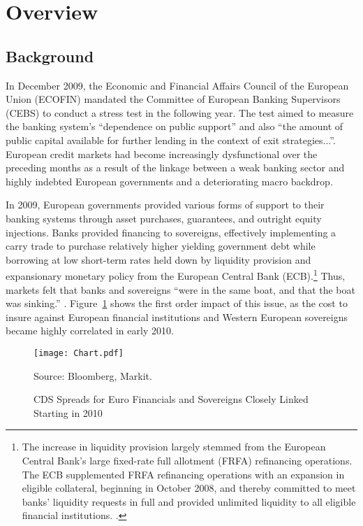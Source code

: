 \documentclass[12pt]{article}
\begin{document}
\section{Overview}

\subsection{Background}

In December 2009, the Economic and Financial Affairs Council of the European Union (ECOFIN) mandated the Committee of European Banking Supervisors (CEBS) to conduct a stress test in the following year. The test aimed to measure the banking system's ``dependence on public support'' and also ``the amount of public capital available for further lending in the context of exit strategies...''\citep{CEBS2009}. European credit markets had become increasingly dysfunctional over the preceding months as a result of the linkage between a weak banking sector and highly indebted European governments and a deteriorating macro backdrop.

In 2009, European governments provided various forms of support to their banking systems through asset purchases, guarantees, and outright equity injections. Banks provided financing to sovereigns, effectively implementing a carry trade to purchase relatively higher yielding government debt while borrowing at low short-term rates held down by liquidity provision and expansionary monetary policy from the European Central Bank (ECB).\footnote{The increase in liquidity provision largely stemmed from the European Central Bank's large fixed-rate full allotment (FRFA) refinancing operations. The ECB supplemented FRFA refinancing operations with an expansion in eligible collateral, beginning in October 2008, and thereby committed to meet banks' liquidity requests in full and provided unlimited liquidity to all eligible financial institutions. \citep{RossWiggins}.} Thus, markets felt that banks and sovereigns ``were in the same boat, and that the boat was sinking.'' \citep{Sunderji}. Figure~\ref{figure1} shows the first order impact of this issue, as the cost to insure against European financial institutions and Western European sovereigns became highly correlated in early 2010.

\begin{figure}[h]
\caption{CDS Spreads for Euro Financials and Sovereigns Closely Linked Starting in 2010}\label{figure1}
\centering
\texttt{[image: Chart.pdf]}
\raggedright
\footnotesize Source: Bloomberg, Markit.
\end{figure}
\end{document}
